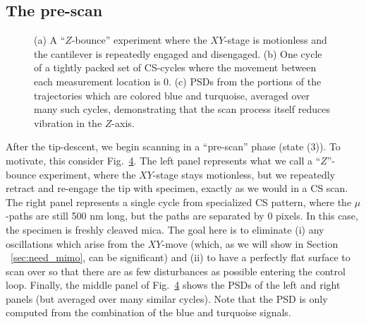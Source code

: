 \subsection{The pre-scan}
\begin{figure}
  \begin{subfigure}{.33\textwidth}
    
    \caption{ }
    \label{fig: }
  \end{subfigure}
  \begin{subfigure}{.33\textwidth}
     
    \caption{ }
    \label{fig:uz_prescan}
  \end{subfigure}
  \begin{subfigure}{.33\textwidth}
     
    \caption{ }
    \label{fig: }
  \end{subfigure}
  \caption{(a) A ``$Z$-bounce'' experiment where the $XY$-stage is motionless and the cantilever is repeatedly engaged and disengaged. (b) One cycle of a tightly packed set of CS-cycles where the movement between each measurement location is 0. (c) PSDs from the portions of the trajectories which are colored blue and turquoise, averaged over many such cycles, demonstrating that the scan process itself reduces vibration in the $Z$-axis.}
  \label{fig:prescan_difference}
\end{figure}
After the tip-descent, we begin scanning in a ``pre-scan'' phase (state (3)). To motivate, this consider Fig.~\ref{fig:prescan_difference}. The left panel represents what we call a ``$Z$''-bounce experiment, where the $XY$-stage stays motionless, but we repeatedly retract and re-engage the tip with specimen, exactly as we would in a CS scan. The right panel represents a single cycle from specialized CS pattern, where the $\mu$-paths are still 500 nm long, but the paths are separated by 0 pixels. In this case, the specimen is freshly cleaved mica. The goal here is to eliminate (i) any oscillations which arise from the $XY$-move (which, as we will show in Section ~\ref{sec:need_mimo}, can be significant) and (ii) to have a perfectly flat surface to scan over so that there are as few disturbances as possible entering the control loop. Finally, the middle panel of Fig.~\ref{fig:prescan_difference} shows the PSDs of the left and right panels (but averaged over many similar cycles). Note that the PSD is only computed from the combination of the blue and turquoise signals.

